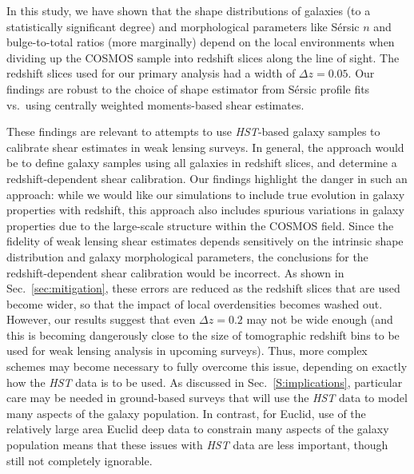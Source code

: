 \documentclass[twocolumn,useAMS,usenatbib]{mn2e}
\newcommand{\sersic}{S\'{e}rsic }
\begin{document}
In this study, we have shown that the shape distributions of galaxies
(to a statistically significant degree) and morphological parameters
like \sersic $n$ and bulge-to-total ratios (more marginally) depend on
the local environments when dividing up the COSMOS sample into
redshift slices along the line of sight.  The redshift slices used for
our primary analysis had
a width of $\Delta z=0.05$.  Our findings are robust to the choice of
shape estimator from \sersic profile fits vs.\ using centrally weighted
moments-based shear estimates.

These findings are relevant to attempts to use {\em HST}-based galaxy
samples to calibrate shear estimates in weak lensing surveys.  In
general, the approach would be to define galaxy samples using all
galaxies in redshift slices, and determine a redshift-dependent shear
calibration.  Our findings highlight the danger in such an approach:
while we would like our simulations to include true evolution in
galaxy properties with redshift, this approach also includes spurious
variations in galaxy properties due to the large-scale structure
within the COSMOS field.  Since the fidelity of weak lensing shear
estimates depends sensitively on the intrinsic shape distribution and
galaxy morphological parameters, the conclusions for the
redshift-dependent shear calibration would be incorrect.  As shown in
Sec.~\ref{sec:mitigation}, these errors
are reduced as the redshift slices that are used become wider, so
that the impact of local overdensities becomes washed out.  However,
our results suggest that even $\Delta z=0.2$ may not be wide enough
(and this is becoming dangerously close to the size of tomographic
redshift bins to be used for weak lensing analysis in upcoming
surveys).  Thus, more complex schemes may become necessary to fully
overcome this issue, depending on exactly how the {\em HST}
  data is to be used.  As discussed in Sec.~\ref{S:implications},
  particular care may be needed in ground-based surveys that will use
  the {\em HST} data to model many aspects of the galaxy population.
  In contrast,  for Euclid, use of the relatively large area Euclid deep
  data to constrain many aspects of the galaxy population means that
  these issues with {\em HST} data are less important, though still
  not completely ignorable.
\end{document}
